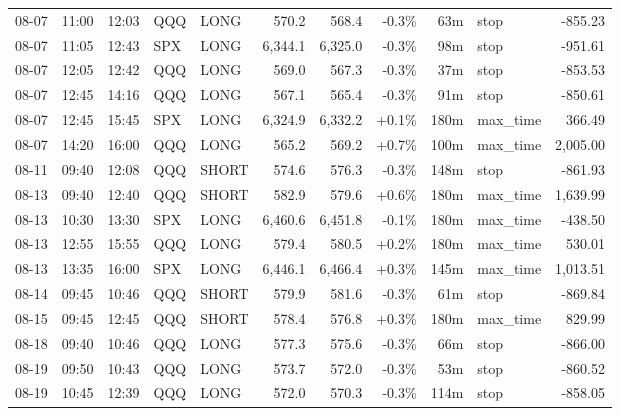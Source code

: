 \documentclass[11pt,a4paper,twoside]{article}
\begin{document}
\begin{center}
\begin{longtable}{>{\color{txtmain}}l l l l l r r r r >{\color{txtmain}}l r}
08-07 & 11:00 & 12:03 & QQQ & LONG & 570.2 & 568.4 & \textcolor{lossred}{-0.3\%} & 63m & stop & \textcolor{lossred}{-855.23} \\
08-07 & 11:05 & 12:43 & SPX & LONG & 6,344.1 & 6,325.0 & \textcolor{lossred}{-0.3\%} & 98m & stop & \textcolor{lossred}{-951.61} \\
08-07 & 12:05 & 12:42 & QQQ & LONG & 569.0 & 567.3 & \textcolor{lossred}{-0.3\%} & 37m & stop & \textcolor{lossred}{-853.53} \\
08-07 & 12:45 & 14:16 & QQQ & LONG & 567.1 & 565.4 & \textcolor{lossred}{-0.3\%} & 91m & stop & \textcolor{lossred}{-850.61} \\
08-07 & 12:45 & 15:45 & SPX & LONG & 6,324.9 & 6,332.2 & \textcolor{wingreen}{+0.1\%} & 180m & max\_time & \textcolor{wingreen}{366.49} \\
08-07 & 14:20 & 16:00 & QQQ & LONG & 565.2 & 569.2 & \textcolor{wingreen}{+0.7\%} & 100m & max\_time & \textcolor{wingreen}{2,005.00} \\
08-11 & 09:40 & 12:08 & QQQ & SHORT & 574.6 & 576.3 & \textcolor{lossred}{-0.3\%} & 148m & stop & \textcolor{lossred}{-861.93} \\
08-13 & 09:40 & 12:40 & QQQ & SHORT & 582.9 & 579.6 & \textcolor{wingreen}{+0.6\%} & 180m & max\_time & \textcolor{wingreen}{1,639.99} \\
08-13 & 10:30 & 13:30 & SPX & LONG & 6,460.6 & 6,451.8 & \textcolor{lossred}{-0.1\%} & 180m & max\_time & \textcolor{lossred}{-438.50} \\
08-13 & 12:55 & 15:55 & QQQ & LONG & 579.4 & 580.5 & \textcolor{wingreen}{+0.2\%} & 180m & max\_time & \textcolor{wingreen}{530.01} \\
08-13 & 13:35 & 16:00 & SPX & LONG & 6,446.1 & 6,466.4 & \textcolor{wingreen}{+0.3\%} & 145m & max\_time & \textcolor{wingreen}{1,013.51} \\
08-14 & 09:45 & 10:46 & QQQ & SHORT & 579.9 & 581.6 & \textcolor{lossred}{-0.3\%} & 61m & stop & \textcolor{lossred}{-869.84} \\
08-15 & 09:45 & 12:45 & QQQ & SHORT & 578.4 & 576.8 & \textcolor{wingreen}{+0.3\%} & 180m & max\_time & \textcolor{wingreen}{829.99} \\
08-18 & 09:40 & 10:46 & QQQ & LONG & 577.3 & 575.6 & \textcolor{lossred}{-0.3\%} & 66m & stop & \textcolor{lossred}{-866.00} \\
08-19 & 09:50 & 10:43 & QQQ & LONG & 573.7 & 572.0 & \textcolor{lossred}{-0.3\%} & 53m & stop & \textcolor{lossred}{-860.52} \\
08-19 & 10:45 & 12:39 & QQQ & LONG & 572.0 & 570.3 & \textcolor{lossred}{-0.3\%} & 114m & stop & \textcolor{lossred}{-858.05} \\

\end{longtable}
\end{center}
\end{document}
